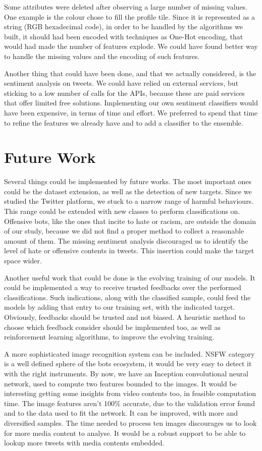 Some attributes were deleted after observing a large number of missing values. One example is the colour chose to fill the profile tile. Since it is represented as a string (RGB hexadecimal code), in order to be handled by the algorithms we built, it should had been encoded with techniques as One-Hot encoding, that would had made the number of features explode. We could have found better way to handle the missing values and the encoding of such features.

Another thing that could have been done, and that we actually considered, is the sentiment analysis on tweets. We could have relied on external services, but sticking to a low number of calls for the APIs, because these are paid services that offer limited free solutions. Implementing our own sentiment classifiers would have been expensive, in terms of time and effort. We preferred to spend that time to refine the features we already have and to add a classifier to the ensemble.

\section{Future Work}
Several things could be implemented by future works. The most important ones could be the dataset extension, as well as the detection of new targets.
Since we studied the Twitter platform, we stuck to a narrow range of harmful behaviours. This range could be extended with new classes to perform classifications on. Offensive bots, like the ones that incite to hate or racism, are outside the domain of our study, because we did not find a proper method to collect a reasonable amount of them. The missing sentiment analysis discouraged us to identify the level of hate or offensive contents in tweets. This insertion could make the target space wider.

Another useful work that could be done is the evolving training of our models. It could be implemented a way to receive trusted feedbacks over the performed classifications. Such indications, along with the classified sample, could feed the models by adding that entry to our training set, with the indicated target. Obviously, feedbacks should be trusted and not biased. A heuristic method to choose which feedback consider should be implemented too, as well as reinforcement learning algorithms, to improve the evolving training.

A more sophisticated image recognition system can be included. NSFW category is a well defined sphere of the bots ecosystem, it would be very easy to detect it with the right instruments. By now, we have an Inception convolutional neural network, used to compute two features bounded to the images. It would be interesting getting some insights from video contents too, in feasible computation time. The image features aren't 100\% accurate, due to the validation error found and to the data used to fit the network. It can be improved, with more and diversified samples. The time needed to process ten images discourages us to look for more media content to analyse. It would be a robust support to be able to lookup more tweets with media contents embedded.

